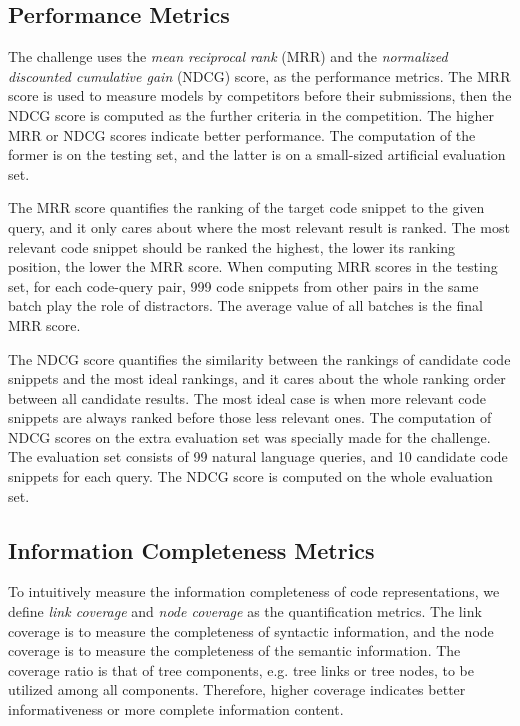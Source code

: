 \documentclass[conference]{IEEEtran}
\begin{document}
\subsection{Performance Metrics}

The challenge uses the \emph{mean reciprocal rank} (MRR) and the \emph{normalized discounted cumulative gain} (NDCG) score, as the performance metrics. The MRR score is used to measure models by competitors before their submissions, then the NDCG score is computed as the further criteria in the competition. The higher MRR or NDCG scores indicate better performance. The computation of the former is on the testing set, and the latter is on a small-sized artificial evaluation set.

The MRR score quantifies the ranking of the target code snippet to the given query, and it only cares about where the most relevant result is ranked. The most relevant code snippet should be ranked the highest, the lower its ranking position, the lower the MRR score. When computing MRR scores in the testing set, for each code-query pair, 999 code snippets from other pairs in the same batch play the role of distractors. The average value of all batches is the final MRR score.





The NDCG score quantifies the similarity between the rankings of candidate code snippets and the most ideal rankings, and it cares about the whole ranking order between all candidate results. The most ideal case is when more relevant code snippets are always ranked before those less relevant ones. The computation of NDCG scores on the extra evaluation set was specially made for the challenge. The evaluation set consists of 99 natural language queries, and 10 candidate code snippets for each query. The NDCG score is computed on the whole evaluation set.

















\subsection{Information Completeness Metrics}
\label{subsec:metric}

To intuitively measure the information completeness of code representations, we define \emph{link coverage} and \emph{node coverage} as the quantification metrics. The link coverage is to measure the completeness of syntactic information, and the node coverage is to measure the completeness of the semantic information. The coverage ratio is that of tree components, e.g. tree links or tree nodes, to be utilized among all components. Therefore, higher coverage indicates better informativeness or more complete information content.
\end{document}
